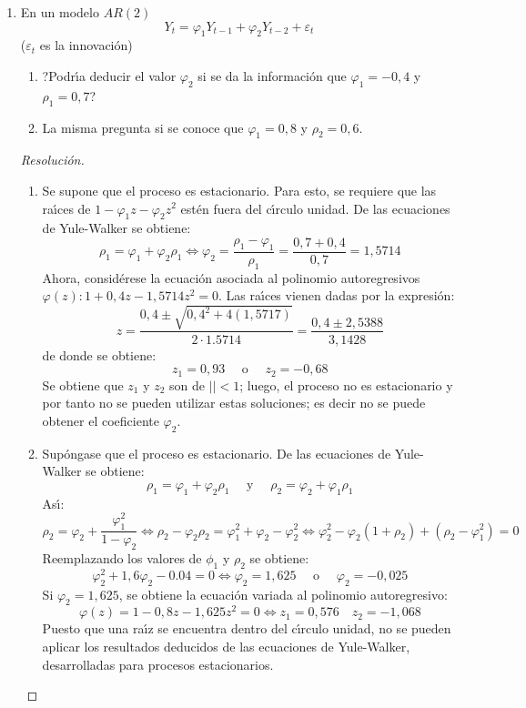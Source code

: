 \begin{ejemplo}
\begin{enumerate}
\item En un modelo $AR(2)$
\[
 Y_{t} =\varphi_{1} Y_{t-1} +\varphi_{2} Y_{t-2} +\varepsilon_{t} 
\]
($\varepsilon_{t}$ es la innovaci\'{o}n)

\begin{enumerate}
\item ?Podr\'{\i}a deducir el valor $\varphi_{2} $ si se da la informaci\'{o}n que $\varphi_{1} =-0,4$ y $\rho_{1} =0,7$?
\item La misma pregunta si se conoce que $\varphi_{1} =0,8$ y $\rho_{2} =0,6$.
\end{enumerate}

\begin{proof}[Resoluci\'{o}n]

\begin{enumerate}
\item Se supone que el proceso es estacionario. Para esto, se requiere que las ra\'{\i}ces de $1 - \varphi_{{1}}z - \varphi_{{2}}z^{2 }$ est\'{e}n fuera del c\'{\i}rculo unidad. De las ecuaciones de Yule-Walker se obtiene: 
\[
\rho_{1}=
\varphi_{1} +\varphi_{2} \rho_{1} 
\Longleftrightarrow 
\varphi_{2} =\frac{\rho_{1} -\varphi_{1} }{\rho_{1} 
}=\frac{0,7+0,4}{0,7}=1,5714
\]
Ahora, consid\'{e}rese la ecuaci\'{o}n asociada al polinomio autoregresivos 
$\varphi (z): 1+0,4z-1,5714z^{2}=0$. Las ra\'{\i}ces vienen dadas por la expresi\'{o}n:
\[
z=\frac{0,4\pm \sqrt {0,4^{2}+4(1,5717)} }{2\cdot 1.5714}=\frac{0,4\pm 2,5388}{3,1428}
\]
de donde se obtiene: 
\[
z_{1 }= 0,93\quad\text{ o }\quad z_{2 }= -0,68
\]
Se obtiene que $z_{1}$ y $z_{2}$ son de $\left| \right|<1$; luego, el 
proceso no es estacionario y por tanto no se pueden utilizar estas 
soluciones; es decir no se puede obtener el coeficiente $\varphi_{2} $.

\item Sup\'{o}ngase que el proceso es estacionario. De las ecuaciones de Yule-Walker se obtiene: 
\[
\rho_{{1}}=
\varphi_{1} +\varphi_{2}\rho_{1}\quad\text{ y }\quad \rho_{2} =\varphi_{2} +\varphi 
_{1} \rho_{1} 
\]
As\'{\i}:
\[
\rho_{2} = \varphi_{2} +\frac{\varphi_{1}^{2} }{1-\varphi_{2} }\Leftrightarrow \rho 
_{2} -\varphi_{2} \rho_{2} =\varphi_{1}^{2} +\varphi_{2} -\varphi 
_{2}^{2} \Leftrightarrow \varphi_{2}^{2} -\varphi_{2} (1+\rho_{2} 
)+(\rho_{2} -\varphi_{1}^{2} )=0
\]
Reemplazando los valores de $\phi_{1}$ y $\rho_{2} $ se obtiene:
\[
\varphi_{2}^{2} +1,6\varphi_{2} -0.04=0\Longleftrightarrow \varphi_{2} 
=1,625\quad\text{ o }\quad \varphi_{2} =-0,025
\]
Si $\varphi_{{2}}=1,625$, se obtiene la ecuaci\'{o}n variada al polinomio 
autoregresivo:
\[
\varphi (z)=1-0,8z-1,625z^{2}=0\Longleftrightarrow z_{1} =0,576\quad z_{2} 
=-1,068
\]
Puesto que una ra\'{\i}z se encuentra dentro del c\'{\i}rculo unidad, no se 
pueden aplicar los resultados deducidos de las ecuaciones de Yule-Walker, 
desarrolladas para procesos estacionarios.


\end{enumerate}
\end{proof}
\end{enumerate}
\end{ejemplo}
